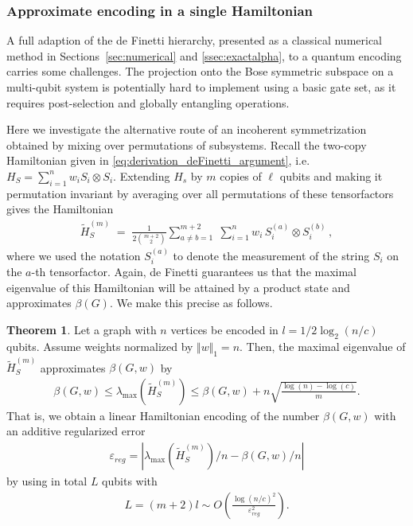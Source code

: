 \documentclass[
12pt,
prx,
aps,
reprint,
a4paper,
longbibliograph,
nofootinbib,
nobibnotes,
superscriptaddress
]{revtex4-2}
\theoremstyle{definition}
\newtheorem{theorem}{Theorem}
\begin{document}
\subsubsection{Approximate encoding in a single Hamiltonian}
A full adaption of the de Finetti hierarchy, presented as a classical numerical method in Sections~\ref{sec:numerical} and \ref{ssec:exactalpha}, to a quantum encoding carries some challenges. The projection onto the Bose symmetric subspace on a multi-qubit system is potentially hard to implement using a basic gate set, as it requires post-selection and globally entangling operations. 

Here we investigate the alternative route of an incoherent symmetrization obtained by mixing over permutations of subsystems.
Recall the two-copy Hamiltonian given  in \eqref{eq:derivation_deFinetti_argument}, i.e. $H_S = \sum_{i=1}^n w_i S_i\otimes S_i$.
Extending $H_s$ by $m$ copies of $\ell$ qubits and making it permutation invariant by averaging over all permutations of these tensorfactors gives the Hamiltonian
\begin{align}
\tilde{H}_S^{(m)} \;=\; \frac{1}{2\binom{m+2}{2}}
\sum_{a\neq b=1}^{m+2}\;
\sum_{i=1}^{n} w_i\,
S_i^{(a)} \otimes S_i^{(b)} \,,
\end{align}
where we used the notation $S_i^{(a)}$ to denote the measurement of the string $S_i$ on the $a$-th tensorfactor. Again, de Finetti guarantees us that the maximal eigenvalue of this Hamiltonian will be attained by a product state and approximates  $\beta(G)$. We make this precise as follows.%

\begin{theorem}
    Let a graph with $n$ vertices be encoded in $l=1/2 \log_2(n/c)$ qubits. Assume weights normalized by $\Vert w \Vert_1=n$. Then, the maximal eigenvalue of $\tilde{H}_S^{(m)}$ approximates $\beta(G,w)$ by 
    \begin{align}
        \beta(G,w) \leq \lambda_{\max}\left( \tilde{H}_S^{(m)} \right) \leq \beta(G,w) + n\sqrt{ \frac{\log(n)-\log(c)}{m}}.
    \end{align}
 That is, we obtain a linear Hamiltonian encoding of the number $\beta(G,w)$ with an additive regularized error 
    \begin{align}
        \varepsilon_{reg} =\left|\lambda_{\max}(\tilde{H}_S^{(m)})/n -\beta(G,w)/n\right|
    \end{align}
    by using in total $L$ qubits with 
    \begin{align}
        L=(m+2)l\sim  O\left(\frac{\log(n/c)^2 }{\varepsilon_{reg}^2}\right).
    \end{align}
\end{theorem}
\end{document}
